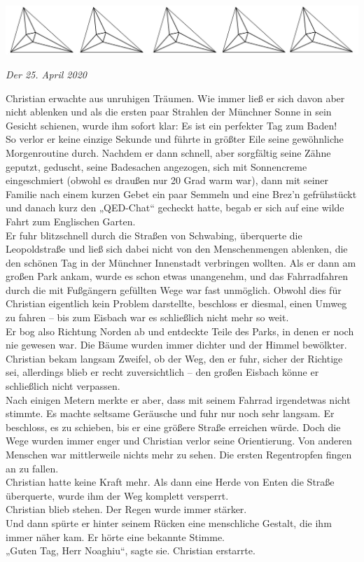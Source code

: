 \documentclass[oneside]{memoir}
\newcommand{\parasep}{
\bigskip
\bigskip
\begin{center} 
   \includegraphics[scale=.08]{parasep5.jpg} 
\end{center}
\bigskip
\bigskip
}
\begin{document}
\parasep

\textit{Der 25. April 2020}

\medskip
\noindent Christian erwachte aus unruhigen Träumen. Wie immer ließ er sich davon aber nicht ablenken und als die ersten paar Strahlen der Münchner Sonne in sein Gesicht schienen, wurde ihm sofort klar: Es ist ein perfekter Tag zum Baden! \\
So verlor er keine einzige Sekunde und führte in größter Eile seine gewöhnliche Morgenroutine durch. Nachdem er dann schnell, aber sorgfältig seine Zähne geputzt, geduscht, seine Badesachen angezogen, sich mit Sonnencreme eingeschmiert (obwohl es draußen nur 20 Grad warm war), dann mit seiner Familie nach einem kurzen Gebet ein paar Semmeln und eine Brez'n gefrühstückt und danach kurz den „QED-Chat“ gecheckt hatte, begab er sich auf eine wilde Fahrt zum Englischen Garten. \\
Er fuhr blitzschnell durch die Straßen von Schwabing, überquerte die Leopoldstraße und ließ sich dabei nicht von den Menschenmengen ablenken, die den schönen Tag in der Münchner Innenstadt verbringen wollten. Als er dann am großen Park ankam, wurde es schon etwas unangenehm, und das Fahrradfahren durch die mit Fußgängern gefüllten Wege war fast unmöglich. Obwohl dies für Christian eigentlich kein Problem darstellte, beschloss er diesmal, einen Umweg zu fahren -- bis zum Eisbach war es schließlich nicht mehr so weit. \\
Er bog also Richtung Norden ab und entdeckte Teile des Parks, in denen er noch nie gewesen war. Die Bäume wurden immer dichter und der Himmel bewölkter. Christian bekam langsam Zweifel, ob der Weg, den er fuhr, sicher der Richtige sei, allerdings blieb er recht zuversichtlich -- den großen Eisbach könne er schließlich nicht verpassen. \\
Nach einigen Metern merkte er aber, dass mit seinem Fahrrad irgendetwas nicht stimmte. Es machte seltsame Geräusche und fuhr nur noch sehr langsam. Er beschloss, es zu schieben, bis er eine größere Straße erreichen würde. Doch die Wege wurden immer enger und Christian verlor seine Orientierung. Von anderen Menschen war mittlerweile nichts mehr zu sehen. Die ersten Regentropfen fingen an zu fallen. \\
Christian hatte keine Kraft mehr. Als dann eine Herde von Enten die Straße überquerte, wurde ihm der Weg komplett versperrt. \\
Christian blieb stehen. Der Regen wurde immer stärker. \\
Und dann spürte er hinter seinem Rücken eine menschliche Gestalt, die ihm immer näher kam.
Er hörte eine bekannte Stimme. \\
„Guten Tag, Herr Noaghiu“, sagte sie.
Christian erstarrte.
 
\end{document}
